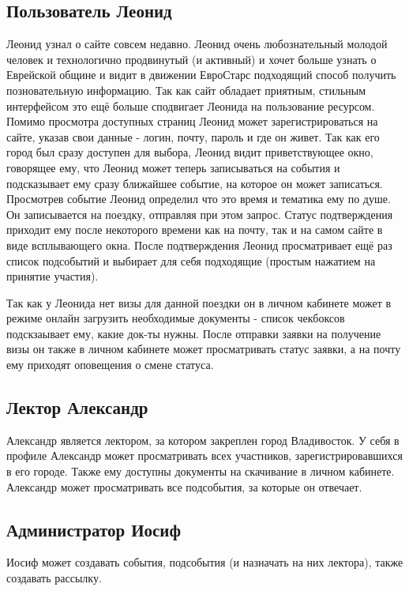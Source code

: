 \documentclass[DIV=calc, paper=a4, fontsize=11pt]{scrartcl} %
\begin{document}
\begin{framed}
\subsection{Пользователь Леонид}
Леонид узнал о сайте совсем недавно. Леонид очень любознательный молодой человек и технологично продвинутый (и активный) и хочет больше узнать о Еврейской общине и видит в движении ЕвроСтарс подходящий способ получить позновательную информацию. Так как сайт обладает приятным, стильным интерфейсом это ещё больше сподвигает Леонида на пользование ресурсом.
\\[0.5cm]
Помимо просмотра доступных страниц Леонид может зарегистрироваться на сайте, указав свои данные - логин, почту, пароль и где он живет. Так как его город был сразу доступен для выбора, Леонид видит приветствующее окно, говорящее ему, что Леонид может теперь записываться на события и подсказывает ему сразу ближайшее событие, на которое он может записаться.
\\[0.5cm]
Просмотрев событие Леонид определил что это время и тематика ему по душе. Он записывается на поездку, отправляя при этом запрос. Статус подтверждения приходит ему после некоторого времени как на почту, так и на самом сайте в виде всплывающего окна. После подтверждения Леонид просматривает ещё раз список подсобытий и выбирает для себя подходящие (простым нажатием на принятие участия).

Так как у Леонида нет визы для данной поездки он в личном кабинете может в режиме онлайн загрузить необходимые документы - список чекбоксов подскзаывает ему, какие док-ты нужны. После отправки заявки на получение визы он также в личном кабинете может просматривать статус заявки, а на почту ему приходят оповещения о смене статуса.
\end{framed}

\begin{framed}
\subsection{Лектор Александр}
Александр является лектором, за котором закреплен город Владивосток. У себя в профиле Александр может просматривать всех участников, зарегистрировавшихся в его городе. Также ему доступны документы на скачивание в личном кабинете. Александр может просматривать все подсобытия, за которые он отвечает.
\end{framed}

\begin{framed}
\subsection{Администратор Иосиф}
Иосиф может создавать события, подсобытия (и назначать на них лектора), также создавать рассылку.
\end{framed}
\end{document}
